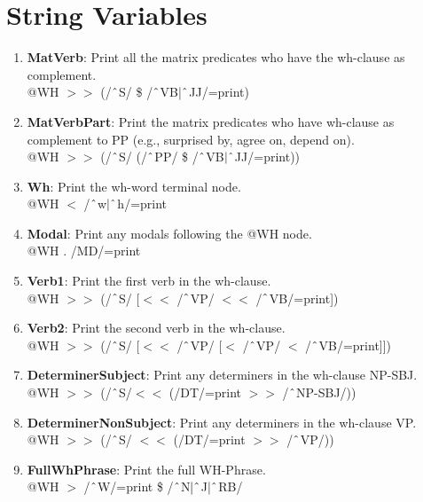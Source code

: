 \section{String Variables}
\begin{enumerate}
    \item \textbf{MatVerb}: Print all the matrix predicates who have the wh-clause as complement.\\
    @WH $>\!\!>$ (/$\string^$S/ \$ /$\string^$VB$|\string^$JJ/=print)

    \item \textbf{MatVerbPart}: Print the matrix predicates who have wh-clause as complement to PP (e.g., \textsf{surprised by}, \textsf{agree on}, \textsf{depend on}).\\
    @WH $>\!\!>$ (/$\string^$S/ (/$\string^$PP/ \$ /$\string^$VB$|\string^$JJ/=print))

    \item \textbf{Wh}: Print the wh-word terminal node.\\
    @WH $<$ /$\string^$w$|\string^$h/=print

    \item \textbf{Modal}: Print any modals following the @WH node.\\
    @WH . /MD/=print

    \item \textbf{Verb1}: Print the first verb in the wh-clause. \\
    @WH $>\!\!>$ (/$\string^$S/ [$<\!\!<$ /$\string^$VP/ $<\!\!<$ /$\string^$VB/=print])

    \item \textbf{Verb2}: Print the second verb in the wh-clause.\\
    @WH $>\!\!>$ (/$\string^$S/ [$<\!\!<$ /$\string^$VP/ [$<$ /$\string^$VP/ $<$ /$\string^$VB/=print]])
    
    \item \textbf{DeterminerSubject}: Print any determiners in the wh-clause NP-SBJ.\\
    @WH $>\!\!>$ (/$\string^$S/$<\!\!<$ (/DT/=print $>\!\!>$ /$\string^$NP-SBJ/))
    
    \item \textbf{DeterminerNonSubject}: Print any determiners in the wh-clause VP.\\
    @WH $>\!\!>$ (/$\string^$S/ $<\!\!<$ (/DT/=print $>\!\!>$ /$\string^$VP/))

    \item \textbf{FullWhPhrase}: Print the full WH-Phrase.\\
    @WH $>$ /$\string^$W/=print \$ /$\string^$N$|\string^$J$|\string^$RB/


\end{enumerate}
